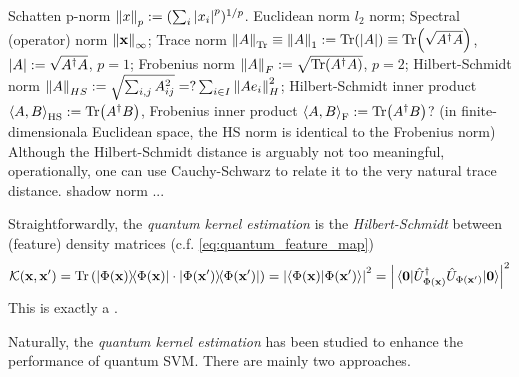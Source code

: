 \begin{notation}[norm]\label{def:norm}
	Schatten p-norm $\norm{x}_p:= (\sum_i \abs{x_i}^p)^{1/p}$.
	Euclidean norm $l_2$ norm;
	Spectral (operator) norm $\norm{\vb{x}}_{\infty}$;
	Trace norm $\norm{A}_{\Tr}\equiv\norm{A}_{1}:=\Tr(\abs{A})\equiv\Tr(\sqrt{A^\dagger A})$, $\abs{A}:=\sqrt{A^\dagger A}$, $p=1$;
	Frobenius norm $\norm{A}_{F}:=\sqrt{\Tr(A^\dagger A)}$, $p=2$;
	Hilbert-Schmidt norm $\norm{A}_{HS}:=\sqrt{\sum_{i,j} A_{ij}^2 }=?\sum_{i\in I}\norm{Ae_i}_H^2$;
	Hilbert-Schmidt inner product $\expval{A,B}_{\textup{HS}}:=\Tr(A^\dagger B)$,
	Frobenius inner product $\expval{A,B}_{\textup{F}}:=\Tr(A^\dagger B)$?
	(in finite-dimensionala Euclidean space, the HS norm is identical to the Frobenius norm)
	Although the Hilbert-Schmidt distance is arguably not too meaningful, operationally, one can use Cauchy-Schwarz to relate it to the very natural trace distance. 
	shadow norm ...
\end{notation}
\begin{definition}\label{def:quantum_kernel}
	Straightforwardly,
	the \emph{quantum kernel estimation} is the \emph{Hilbert-Schmidt}  between (feature) density matrices (c.f. \cref{eq:quantum_feature_map})
	\begin{equation}
		\kernel(\vbx,\vbx') 
		= \Tr\qty(\dyad{\Phi(\vbx)}\cdot \dyad{\Phi(\vbx')})
		= \abs{\braket{\Phi(\vbx)}{\Phi(\vbx')}}^2 = 
		\abs{\matrixel{\vb{0}}{\U^\dagger_{\Phi(\vbx)} \U_{\Phi(\vbx')}}{\vb{0}}}^2
	\end{equation}
	This is exactly a .
\end{definition}
Naturally, the \emph{quantum kernel estimation}
\cite{schuldQuantumMachineLearning2019}
\cite{havlicekSupervisedLearningQuantum2019} 
has been studied to enhance the performance of quantum SVM.
There are mainly two approaches.


